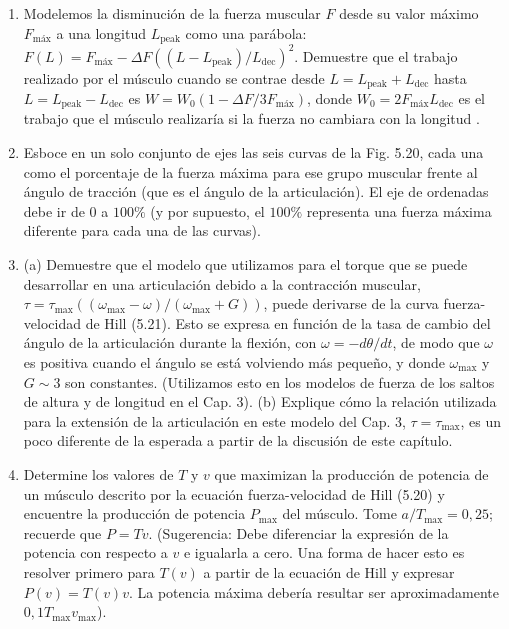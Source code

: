 \documentclass[12pt]{book}
\begin{document}
\begin{enumerate}
\item[5.18] Modelemos la disminución de la fuerza muscular $F$ desde su valor máximo $F_{\text{máx}}$ a una longitud $L_{\text{peak}}$ como una parábola: $F(L) = F_{\text{máx}} - \Delta F((L - L_{\text{peak}})/L_{\text{dec}})^2$. Demuestre que el trabajo realizado por el músculo cuando se contrae desde $L = L_{\text{peak}} + L_{\text{dec}}$ hasta $L = L_{\text{peak}} - L_{\text{dec}}$ es $W = W_0(1 - \Delta F/3F_{\text{máx}})$, donde $W_0 = 2F_{\text{máx}}L_{\text{dec}}$ es el trabajo que el músculo realizaría si la fuerza no cambiara con la longitud \cite{55}.

\item[5.19] Esboce en un solo conjunto de ejes las seis curvas de la Fig. 5.20, cada una como el porcentaje de la fuerza máxima para ese grupo muscular frente al ángulo de tracción (que es el ángulo de la articulación). El eje de ordenadas debe ir de $0$ a $100\%$ (y por supuesto, el $100\%$ representa una fuerza máxima diferente para cada una de las curvas).

\item[5.20] (a) Demuestre que el modelo que utilizamos para el torque que se puede desarrollar en una articulación debido a la contracción muscular, $\tau = \tau_{\text{max}}((\omega_{\text{max}} - \omega)/(\omega_{\text{max}} + G))$, puede derivarse de la curva fuerza-velocidad de Hill (5.21). Esto se expresa en función de la tasa de cambio del ángulo de la articulación durante la flexión, con $\omega = -d\theta/dt$, de modo que $\omega$ es positiva cuando el ángulo se está volviendo más pequeño, y donde $\omega_{\text{max}}$ y $G \sim 3$ son constantes. (Utilizamos esto en los modelos de fuerza de los saltos de altura y de longitud en el Cap. 3).
(b) Explique cómo la relación utilizada para la extensión de la articulación en este modelo del Cap. 3, $\tau = \tau_{\text{max}}$, es un poco diferente de la esperada a partir de la discusión de este capítulo.

\item[5.21] Determine los valores de $T$ y $v$ que maximizan la producción de potencia de un músculo descrito por la ecuación fuerza-velocidad de Hill (5.20) y encuentre la producción de potencia $P_{\text{max}}$ del músculo. Tome $a/T_{\text{max}} = 0{,}25$; recuerde que $P = T v$. (Sugerencia: Debe diferenciar la expresión de la potencia con respecto a $v$ e igualarla a cero. Una forma de hacer esto es resolver primero para $T(v)$ a partir de la ecuación de Hill y expresar $P(v) = T(v)v$. La potencia máxima debería resultar ser aproximadamente $0{,}1 T_{\text{max}} v_{\text{max}}$).


\end{enumerate}
\end{document}
